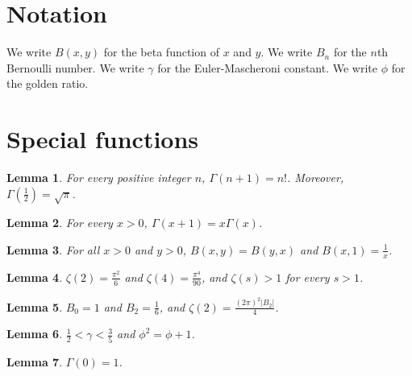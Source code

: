 \documentclass{article}
\newtheorem{lemma}{Lemma}
\begin{document}
\section{Notation}

We write $B(x,y)$ for the beta function of $x$ and $y$.
We write $B_n$ for the $n$th Bernoulli number.
We write $\gamma$ for the Euler-Mascheroni constant.
We write $\phi$ for the golden ratio.

\section{Special functions}

\begin{lemma}\label{gamma}
For every positive integer $n$, $\Gamma(n+1)=n!$. Moreover, $\Gamma(\frac12)=\sqrt{\pi}$.
\end{lemma}

\begin{lemma}\label{functional}
For every $x>0$, $\Gamma(x+1)=x\Gamma(x)$.
\end{lemma}

\begin{lemma}\label{beta}
For all $x>0$ and $y>0$, $B(x,y)=B(y,x)$ and $B(x,1)=\frac{1}{x}$.
\end{lemma}

\begin{lemma}\label{zeta}
$\zeta(2)=\frac{\pi^2}{6}$ and $\zeta(4)=\frac{\pi^4}{90}$, and $\zeta(s)>1$ for every $s>1$.
\end{lemma}

\begin{lemma}\label{bernoulli}
$B_0=1$ and $B_2=\frac16$, and $\zeta(2)=\frac{(2\pi)^2|B_2|}{4}$.
\end{lemma}

\begin{lemma}\label{constants}
$\frac12<\gamma<\frac35$ and $\phi^2=\phi+1$.
\end{lemma}

\begin{lemma}\label{pole}
$\Gamma(0)=1$.
\end{lemma}
\end{document}
